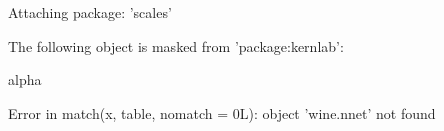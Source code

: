 \documentclass[letterpaper]{article}\usepackage[]{graphicx}\usepackage[]{color}
\begin{document}
\begin{Schunk}
\begin{Soutput}
Attaching package: 'scales'
\end{Soutput}
\begin{Soutput}
The following object is masked from 'package:kernlab':

    alpha
\end{Soutput}
\begin{Soutput}
Error in match(x, table, nomatch = 0L): object 'wine.nnet' not found
\end{Soutput}
\end{Schunk}
\end{document}
